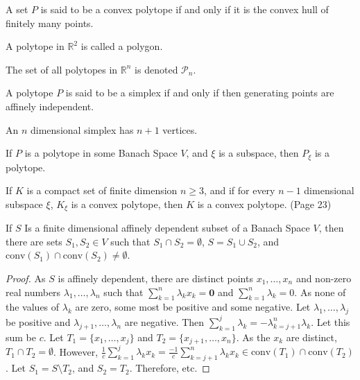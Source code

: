 \documentclass[crop=false,class=article,oneside]{standalone}
\begin{document}
        \begin{definition}
        A set $P$ is said to be a convex polytope if and only if it is the convex hull of finitely many points.
        \end{definition}
        \begin{definition}
        A polytope in $\mathbb{R}^2$ is called a polygon.
        \end{definition}
        \begin{notation}
        The set of all polytopes in $\mathbb{R}^n$ is denoted $\mathscr{P}_n$.
        \end{notation}
        \begin{definition}
        A polytope $P$ is said to be a simplex if and only if then generating points are affinely independent.
        \end{definition}
        \begin{theorem}
        An $n$ dimensional simplex has $n+1$ vertices.
        \end{theorem}
        \begin{theorem}
        If $P$ is a polytope in some Banach Space $V$, and $\xi$ is a subspace, then $P_{\xi}$ is a polytope.
        \end{theorem}
        \begin{theorem}
        If $K$ is a compact set of finite dimension $n\geq 3$, and if for every $n-1$ dimensional subspace $\xi$, $K_{\xi}$ is a convex polytope, then $K$ is a convex polytope. (Page 23)
        \end{theorem}
        \begin{theorem}
        If $S$ Is a finite dimensional affinely dependent subset of a Banach Space $V$, then there are sets $S_1,S_2\in V$ such that $S_1\cap S_2 = \emptyset$, $S=S_1\cup S_2$, and $\textrm{conv}(S_1)\cap \textrm{conv}(S_2) \ne \emptyset$.
        \end{theorem}
        \begin{proof}
        As $S$ is affinely dependent, there are distinct points $x_1,\hdots,x_n$ and non-zero real numbers $\lambda_1,\hdots,\lambda_n$ such that $\sum_{k=1}^{n}\lambda_k x_k= \mathbf{0}$ and $\sum_{k=1}^{n}\lambda_k = 0$. As none of the values of $\lambda_k$ are zero, some most be positive and some negative. Let $\lambda_1,\hdots, \lambda_j$ be positive and $\lambda_{j+1},\hdots, \lambda_n$ are negative. Then $\sum_{k=1}^{j} \lambda_k = - \lambda_{k=j+1}^{n}\lambda_k$. Let this sum be $c$. Let $T_1 = \{x_1,\hdots, x_j\}$ and $T_2=\{x_{j+1},\hdots, x_{n}\}$. As the $x_k$ are distinct, $T_1\cap T_2 = \emptyset$. However, $\frac{1}{c}\sum_{k=1}^{j}\lambda_k x_k = \frac{-1}{c}\sum_{k=j+1}^{n} \lambda_k x_k \in\textrm{conv}(T_1)\cap \textrm{conv}(T_2)$. Let $S_1 = S\setminus T_2$, and $S_2 = T_2$. Therefore, etc.
        \end{proof}
\end{document}
